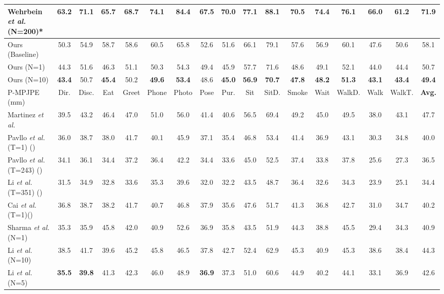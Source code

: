 \documentclass[letterpaper, 10 pt, conference]{ieeeconf}
\begin{document}
\begin{table*}[t]
{\begin{tabular}{l|ccccccccccccccc|c}
        Wehrbein \textit{et al.} \cite{wehrbein2021probabilistic} (N=200)* & 63.2 & 71.1 & 65.7 & 68.7 & 74.1 & 84.4 & 67.5 & 70.0 & 77.1 & 88.1 & 70.5 & 74.4 & 76.1 & 66.0 & 61.2 & 71.9 \\
        \hline
        Ours (Baseline) & 50.3 & 54.9 & 58.7 & 58.6 & 60.5 & 65.8 &52.6  &51.6  &66.1  &79.1  & 57.6 & 56.9 & 60.1 & 47.6 & 50.6 & 58.1 \\
        Ours (N=1) & 44.3 & 51.6 & 46.3 & 51.1 & 50.3 & 54.3 &49.4 & 45.9 & 57.7 & 71.6 & 48.6 & 49.1 & 52.1 & 44.0 & 44.4 & 50.7\\
        Ours (N=10) & \textbf{43.4} & 50.7 & \textbf{45.4} & 50.2 & \textbf{49.6} & \textbf{53.4} & 48.6 & \textbf{45.0} & \textbf{56.9} & \textbf{70.7} & \textbf{47.8} & \textbf{48.2}  & \textbf{51.3} & \textbf{43.1}  & \textbf{43.4} & \textbf{49.4} \\
        \midrule\midrule
        P-MPJPE (mm) & Dir. & Disc. & Eat & Greet & Phone & Photo & Pose & Pur. & Sit & SitD. & Smoke & Wait & WalkD. & Walk & WalkT. & \textbf{Avg.} \\
        \hline
        Martinez \textit{et al.} \cite{martinez2017simple} & 39.5& 43.2& 46.4& 47.0& 51.0& 56.0& 41.4& 40.6& 56.5& 69.4& 49.2& 45.0& 49.5& 38.0& 43.1 &47.7\\
        Pavllo \textit{et al.} \cite{pavllo20193d} (T=1) ()  &36.0 &38.7& 38.0& 41.7& 40.1& 45.9& 37.1& 35.4& 46.8& 53.4& 41.4& 36.9& 43.1& 30.3& 34.8& 40.0\\
        Pavllo \textit{et al.} \cite{pavllo20193d} (T=243) () &34.1 &36.1& 34.4 &37.2& 36.4& 42.2& 34.4& 33.6 &45.0& 52.5& 37.4& 33.8& 37.8& 25.6& 27.3& 36.5\\
        Li \textit{et al.} \cite{li2022mhformer} (T=351) () &31.5& 34.9& 32.8 &33.6& 35.3& 39.6& 32.0 &32.2 &43.5& 48.7& 36.4& 32.6& 34.3& 23.9 &25.1 &34.4\\
        Cai \textit{et al.} \cite{cai2019exploiting} (T=1)()  &36.8& 38.7& 38.2& 41.7& 40.7& 46.8& 37.9& 35.6& 47.6 &51.7& 41.3& 36.8 &42.7& 31.0 &34.7 &40.2
        \\\hline
        Sharma \textit{et al.} \cite{sharma2019monocular} (N=1)  & 35.3& 35.9& 45.8& 42.0& 40.9& 52.6& 36.9& 35.8& 43.5& 51.9& 44.3& 38.8& 45.5& 29.4& 34.3& 40.9  \\
        Li \textit{et al.} \cite{li2020weakly} (N=10)  &38.5& 41.7& 39.6& 45.2& 45.8& 46.5& 37.8& 42.7& 52.4& 62.9& 45.3& 40.9& 45.3& 38.6& 38.4& 44.3 \\        
        Li \textit{et al.} \cite{li2019generating} (N=5)  & \textbf{35.5}& \textbf{39.8}& 41.3 &42.3& 46.0& 48.9& \textbf{36.9}& 37.3& 51.0& 60.6& 44.9& 40.2& 44.1& 33.1& 36.9& 42.6 \\

\end{tabular}}
\end{table*}
\end{document}
